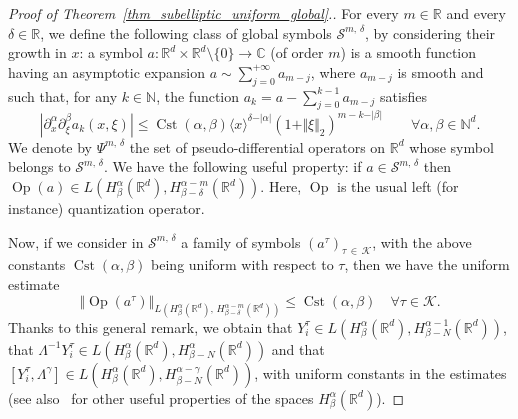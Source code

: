 \documentclass[10pt]{amsart}
\theoremstyle{definition}\newtheorem{defi}[theo]{Definition}\newtheorem{rema}[theo]{Remark}\newtheorem{exam}[theo]{Example}\newtheorem{exem}[theo]{Example}\newtheorem{nota}[theo]{Notation}
\newcommand*\R{\mathbb{R}}
\newcommand*\N{\mathbb{N}}
\newcommand*\C{\mathbb{C}}
\newcommand{\calK}{\mathcal{K}}
\newcommand{\calS}{\mathcal{S}}
\DeclareMathOperator{\Op}{Op}
\DeclareMathOperator{\Cst}{Cst}
\renewcommand{\leq}{\leqslant}
\let\oldforall\forall
\renewcommand*{\forall}{\mathrel{\oldforall}}
\begin{document}
\begin{proof}[Proof of Theorem~\ref{thm_subelliptic_uniform_global}.]
For every $m\in\R$ and every $\delta\in\R$, we define the following class of global symbols $\calS^{m,\,\delta}$, by considering their growth in $x$: a symbol $a:\R^d\times\R^d\setminus \{0\}\rightarrow \C$ (of order $m$) is a smooth function having an asymptotic expansion $a\sim \sum _{j=0}^{+\infty} a_{m-j}$, where $a_{m-j}$ is smooth and such that, for any $k\in\N$, the function $a_k=a-\sum _{j=0}^{k-1}a_{m-j}$ satisfies
\[
\left\vert \partial_x^\alpha \partial_\xi^\beta a_k (x,\xi)\right\vert \leq \Cst(\alpha,\beta) \langle x\rangle^{\delta-\vert\alpha\vert} (1+\Vert\xi\Vert_2)^{m-k-\vert\beta\vert} \qquad\forall \alpha,\beta\in\N^d.
\]
We denote by $\Psi^{m,\,\delta}$ the set of pseudo-differential operators on $\R^d$ whose symbol belongs to $\calS^{m,\,\delta}$. We have the following useful property: if $a\in\calS^{m,\,\delta}$ then $\Op(a) \in L(H^\alpha_\beta(\R^d),H^{\alpha-m}_{\beta-\delta}(\R^d))$. Here, $\Op$ is the usual left (for instance) quantization operator.

Now, if we consider in $\calS^{m,\,\delta}$ a family of symbols $(a^\tau)_{\tau\,\in\,\calK}$, with the above constants $\Cst(\alpha,\beta)$ being uniform with respect to $\tau$, then we have the uniform estimate
\[
\left\Vert \Op(a^\tau)\right\Vert_{L\left(H^\alpha_\beta\left(\R^d\right),\,H^{\alpha-m}_{\beta-\delta}\left(\R^d\right)\right)}\leq \Cst(\alpha,\beta) \quad\forall \tau\in\calK.
\]
Thanks to this general remark, we obtain that $Y^\tau_i \in L(H^\alpha_\beta(\R^d),H^{\alpha-1}_{\beta-N}(\R^d))$, that $\Lambda^{-1}Y^\tau_i \in L(H^\alpha_\beta(\R^d),H^\alpha_{\beta-N}(\R^d))$ and that $[Y^\tau_i,\Lambda^\gamma] \in L(H^\alpha_\beta(\R^d),H^{\alpha-\gamma}_{\beta-N}(\R^d))$, with uniform constants in the estimates (see also~\cite[Lemma~3.2]{EckmannHairer} for other useful properties of the spaces $H^\alpha_\beta(\R^d)$).


\end{proof}
\end{document}

